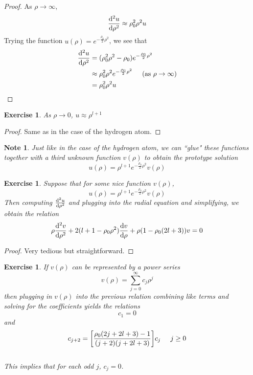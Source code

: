 \documentclass[12pt]{amsart}
\newtheorem{note}[thm]{Note}
\newtheorem{ex}[thm]{Exercise}
\begin{document}
\begin{proof}
As $\rho \rightarrow \infty$, $$\dv[2]{u}{\rho} \approx \rho_0^2 \rho^2u$$ Trying the function $u(\rho) = e^{-\frac{\rho_0}{2}\rho^2}$, we see that
\begin{align*}
\dv[2]{u}{\rho} 
&= (\rho_0^2 \rho^2 - \rho_0)e^{-\frac{\rho_0}{2}\rho^2}\\
& \approx \rho_0^2 \rho^2 e^{-\frac{\rho_0}{2}\rho^2} \hspace{.5cm} \text{(as }  \rho  \rightarrow \infty \text{)}\\
&=  \rho_0^2 \rho^2 u
\end{align*}
\end{proof}

\begin{ex}
As $\rho \rightarrow 0$, $u \approx \rho^{l+1}$
\end{ex}

\begin{proof}
Same as in the case of the hydrogen atom.
\end{proof}

\begin{note}
Just like in the case of the hydrogen atom, we can ``glue" these functions together with a third unknown function $v(\rho)$ to obtain the prototype solution $$u(\rho) = \rho^{l+1}e^{-\frac{\rho_0}{2}\rho^2}v(\rho)$$
\end{note}

\begin{ex}
Suppose that for some nice function $v(\rho)$, $$u(\rho) = \rho^{l+1}e^{-\frac{\rho_0}{2}\rho^2}v(\rho)$$ Then computing $\dv[2]{u}{\rho}$ and plugging into the radial equation and simplifying, we obtain the relation $$\rho \dv[2]{v}{\rho} +2(l+1 - \rho_0\rho^2)\dv{v}{\rho} + \rho(1-\rho_0(2l+3))v = 0$$
\end{ex}

\begin{proof}
Very tedious but straightforward.
\end{proof}

\begin{ex}
If $v(\rho)$ can be represented by a power series $$v(\rho) = \sum_{j=0}^{\infty}c_j\rho^j$$ then plugging in $v(\rho)$ into the previous relation combining like terms and solving for the coefficients yields the relations $$c_1 = 0$$ and $$c_{j+2} = \bigg[ \frac{\rho_0(2j+2l+3)-1}{(j+2)(j+2l+3)}\bigg]c_j \hspace{5mm} j \geq 0$$ \vspace{3mm} \\This implies that for each odd $j$, $c_j = 0$. \vspace{3mm}
\end{ex}
\end{document}
